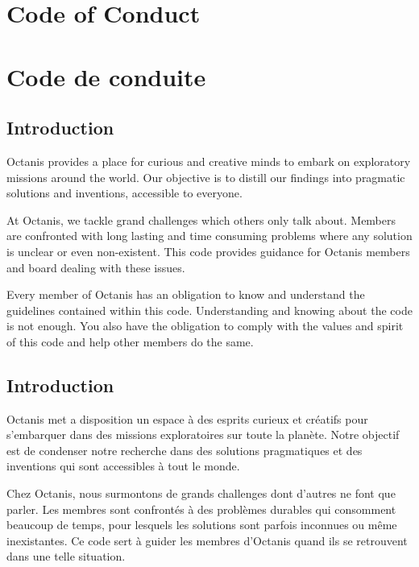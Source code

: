 
\renewcommand{\thesubsection}{\arabic{subsection}}

\english
	\section*{Code of Conduct}

\french
	\section*{Code de conduite}



\english
	\subsection{Introduction}
	{\semibold Octanis provides a place for curious and creative minds to embark on exploratory missions around the world. Our objective is to distill our findings into pragmatic solutions and inventions, accessible to everyone. }


	At Octanis, we tackle grand challenges which others only talk about. Members are confronted with long lasting and time consuming problems where any solution is unclear or even non-existent. This code provides guidance for Octanis members and board dealing with these issues.

	Every member of Octanis has an obligation to know and understand the guidelines contained within this code.
	Understanding and knowing about the code is not enough. You also have the obligation to comply with the values and spirit of this code and help other members do the same.

\french
	\subsection{Introduction}
	{\semibold Octanis met a disposition un espace à des esprits curieux et créatifs pour s'embarquer dans des missions exploratoires sur toute la planète. Notre objectif est de condenser notre recherche dans des solutions pragmatiques et des inventions qui sont accessibles à tout le monde. }


	Chez Octanis, nous surmontons de grands challenges dont d'autres ne font que parler. Les membres sont confrontés à des problèmes durables qui consomment beaucoup de temps, pour lesquels les solutions sont parfois inconnues ou même inexistantes. Ce code sert à guider les membres d'Octanis quand ils se retrouvent dans une telle situation. 

